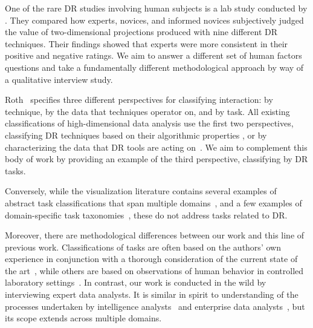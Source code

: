 One of the rare \ac{DR} studies involving human subjects is a lab study conducted by \citet{Lewis2012}. 
They compared how experts, novices, and informed novices subjectively judged the value of two-dimensional projections produced with nine different \ac{DR} techniques. 
Their findings showed that experts were more consistent in their positive and negative ratings. 
We aim to answer a different set of human factors questions and take a fundamentally different methodological approach by way of a qualitative interview study.

Roth~\cite{Roth2013} specifies three different perspectives for classifying interaction: by technique, by the data that techniques operator on, and by task. 
All existing classifications of high-dimensional data analysis use the first two perspectives, classifying \ac{DR} techniques based on their algorithmic properties \cite{Cunningham2008,France2011,Jain2000,VanderMaaten2009,Witten2011}, or by characterizing the data that \ac{DR} tools are acting on~\cite{Bertini2011,Sedlmair2012a}. 
We aim to complement this body of work by providing an example of the third perspective, classifying by \ac{DR} tasks. 

Conversely, while the visualization literature contains several examples of abstract task classifications that span multiple domains~\cite{Amar2005,Amar2004,Gotz2008,Shneiderman1996,Springmeyer1992,Yi2007}, and a few examples of domain-specific task taxonomies~\cite{Trafton2000},
these do not address tasks related to \ac{DR}.

Moreover, there are methodological differences between our work and this line of previous work. 
Classifications of tasks are often based on the authors' own experience in conjunction with a thorough consideration of the current state of the art~\cite{Amar2004,Shneiderman1996,Yi2007}, while others are based on observations of human behavior in controlled laboratory settings~\cite{Amar2005,Gotz2008}. 
In contrast, our work is conducted in the wild by interviewing expert data analysts. It is similar in spirit to understanding of the processes undertaken by intelligence analysts~\cite{Kang2011} and enterprise data analysts~\cite{Kandel2012}, but its scope extends across multiple domains.  

